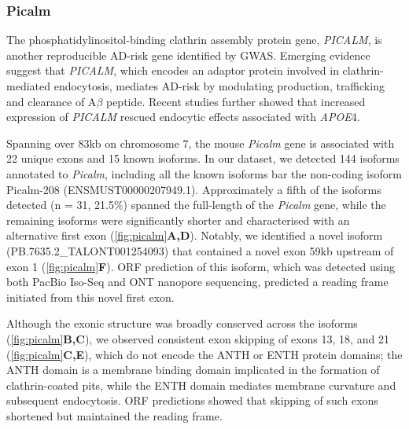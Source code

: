 \newpage
\subsubsection{Picalm}
The phosphatidylinositol-binding clathrin assembly protein gene, \textit{PICALM}, is another reproducible AD-risk gene identified by GWAS. Emerging evidence suggest that \textit{PICALM}, which encodes an adaptor protein involved in clathrin-mediated endocytosis,  mediates AD-risk by modulating production, trafficking and clearance of A$\beta$ peptide\cite{Ando2016}. Recent studies further showed that increased expression of \textit{PICALM} rescued endocytic effects associated with \textit{APOE}4\cite{Narayan2020}.

Spanning over 83kb on chromosome 7, the mouse \textit{Picalm} gene is associated with 22 unique exons and 15 known isoforms. In our dataset, we detected 144 isoforms annotated to \textit{Picalm}, including all the known isoforms bar the non-coding isoform Picalm-208 (ENSMUST00000207949.1). Approximately a fifth of the isoforms detected (n = 31, 21.5\%) spanned the full-length of the \textit{Picalm} gene, while the remaining isoforms were significantly shorter and characterised with an alternative first exon (\cref{fig:picalm}\textbf{A,D}). Notably, we identified a novel isoform (PB.7635.2\_TALONT001254093) that contained a novel exon 59kb upstream of exon 1 (\cref{fig:picalm}\textbf{F}). ORF prediction of this isoform, which was detected using both PacBio Iso-Seq and ONT nanopore sequencing, predicted a reading frame initiated from this novel first exon.  

Although the exonic structure was broadly conserved across the isoforms (\cref{fig:picalm}\textbf{B,C}), we observed consistent exon skipping of exons 13, 18, and 21 (\cref{fig:picalm}\textbf{C,E}), which do not encode the ANTH or ENTH protein domains; the ANTH domain is a membrane binding domain implicated in the formation of clathrin-coated pits, while the ENTH domain mediates membrane curvature and subsequent endocytosis. ORF predictions showed that skipping of such exons shortened but maintained the reading frame. 


